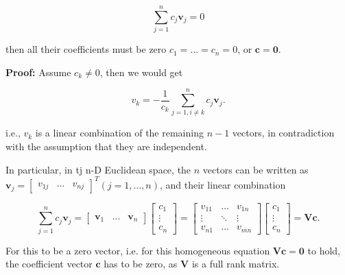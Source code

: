\documentclass[10pt,b5paper,titlepage]{book}
\begin{document}
\begin{itemize}
        \begin{equation}
            \sum_{j=1}^{n} c_{j} \mathbf{v}_{j} = 0
        \end{equation}

        then all their coefficients must be zero $c_1 = \ldots = c_{n} = 0$,
        or $\mathbf{c} = \mathbf{0}$.

        \textbf{Proof:} Assume $c_{k} \neq 0$, then we would get

        \begin{equation}
            v_{k} = - \frac{1}{c_{k}} \sum_{j=1, i \neq k}^{n} c_{j} \mathbf{v}_{j}
        .\end{equation}

        i.e., $v_{k}$ is a linear combination of the remaining $n - 1$ vectors,
        in contradiction with the assumption that they are independent.

        In particular, in tj n-D Euclidean space, the $n$ vectors can be written as
        $\mathbf{v}_{j} = \begin{bmatrix} v_{1j} & \ldots & v_{nj} \end{bmatrix}^{T} (j = 1, \ldots, n)$,
        and their linear combination

        \begin{equation}
            \sum_{j=1}^{n} c_{j} \mathbf{v}_{j}
            = \begin{bmatrix}
               \mathbf{v}_1 & \ldots & \mathbf{v}_n
            \end{bmatrix}
            \begin{bmatrix}
                c_1\\ \vdots\\ c_n
            \end{bmatrix}
            = \begin{bmatrix}
                v_{11} & \ldots & v_{1n}\\
                \vdots & \ddots & \vdots\\
                v_{n1} & \ldots & v_{mn}
            \end{bmatrix}
            \begin{bmatrix} c_1\\ \vdots\\ c_n \end{bmatrix}
            = \mathbf{V} \mathbf{c}
        .\end{equation}

        For this to be a zero vector, i.e. for this homogeneous equation
        $\mathbf{V} \mathbf{c} = \mathbf{0}$ to hold, the coefficient vector
        $\mathbf{c}$ has to be zero, as $\mathbf{V}$ is a full rank matrix.



\end{itemize}
\end{document}
